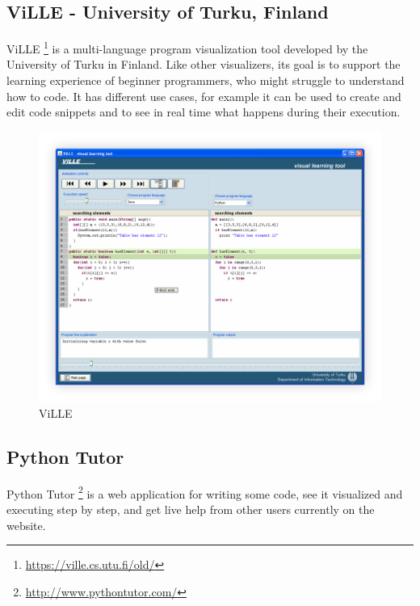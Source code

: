 \documentclass[]{usiinfbachelorproject}
\begin{document}
\subsection{ViLLE - University of Turku, Finland}

ViLLE \footnote{\url{https://ville.cs.utu.fi/old/}} is a multi-language program visualization tool developed by the University of Turku in Finland. Like other visualizers, its goal is to support the learning experience of beginner programmers, who might struggle to understand how to code. It has different use cases, for example it can be used to create and edit code snippets and to see in real time what happens during their execution.

\begin{figure}[h!]
\centering
\includegraphics[scale=0.165]{figures/ville.png}
\caption {ViLLE}
\end{figure}

\subsection{Python Tutor}

Python Tutor \footnote{\url{http://www.pythontutor.com/}} is a web application for writing some code, see it visualized and executing step by step, and get live help from other users currently on the website.
\end{document}
